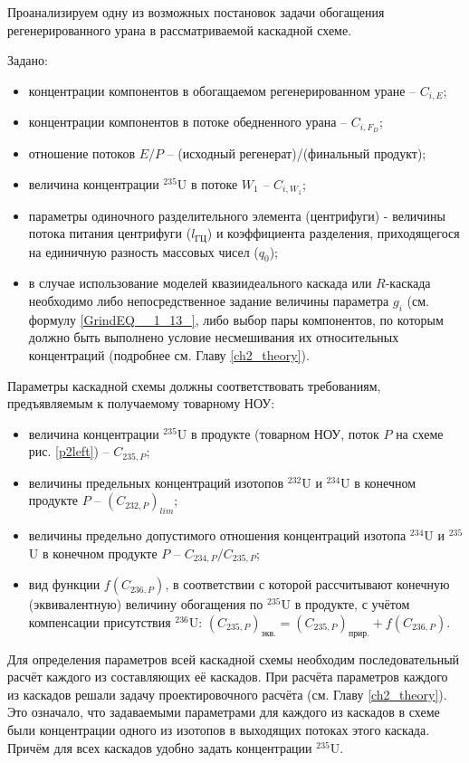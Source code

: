 Проанализируем одну из возможных постановок задачи обогащения регенерированного урана в рассматриваемой каскадной схеме.

Задано:

\begin{itemize}
    \item концентрации компонентов в обогащаемом регенерированном уране -- $C_{i,{E}}$;
    \item концентрации компонентов в потоке обедненного урана -- $C_{i,{F_{D}}}$;
    \item отношение потоков $E/P$ -- (исходный регенерат)/(финальный продукт);
    \item величина концентрации $^{235}$U в потоке $W_{1}$ -- $C_{i,{W_1}}$;
    \item параметры одиночного разделительного элемента (центрифуги) - величины потока питания центрифуги ($l_{ГЦ}$) и коэффициента разделения, приходящегося на единичную разность массовых чисел ($q_{0}$);
    \item в случае использование моделей квазиидеального каскада или $R$-каскада необходимо либо непосредственное задание величины параметра $g_i$ (см. формулу \ref{GrindEQ__1_13_}, либо выбор пары компонентов, по которым должно быть выполнено условие несмешивания их относительных концентраций (подробнее см. Главу \ref{ch2_theory}).
\end{itemize}

Параметры каскадной схемы должны соответствовать требованиям, предъявляемым к получаемому товарному НОУ:

\begin{itemize}
    \item величина концентрации $^{235}$U в продукте (товарном НОУ, поток $P$ на схеме рис. \ref{p2left}) -- $C_{235,{P}}$;
    \item величины предельных концентраций изотопов $^{232}$U и $^{234}$U в конечном продукте $P$ -- $(C_{232,{P}})_{lim}$;
    \item величины предельно допустимого отношения концентраций изотопа $^{234}$U и $^{235}$U в конечном продукте $P$ -- ${C_{234,{P}}}/{C_{235,{P}}}$;
    \item вид функции $f(C_{236,P})$, в соответствии с которой рассчитывают конечную (эквивалентную) величину обогащения по $^{235}$U в продукте, с учётом компенсации присутствия $^{236}$U:
    $(C_{235,P})_\textit{экв.}=(C_{235,P})_\textit{прир.}+f(C_{236,P})$.    
\end{itemize}

Для определения параметров всей каскадной схемы необходим последовательный расчёт каждого из составляющих её каскадов. При расчёта параметров каждого из каскадов решали задачу проектировочного расчёта (см. Главу \ref{ch2_theory}). Это означало, что задаваемыми параметрами для каждого из каскадов в схеме были концентрации одного из изотопов в выходящих потоках этого каскада. Причём для всех каскадов удобно задать концентрации $^{235}$U.

